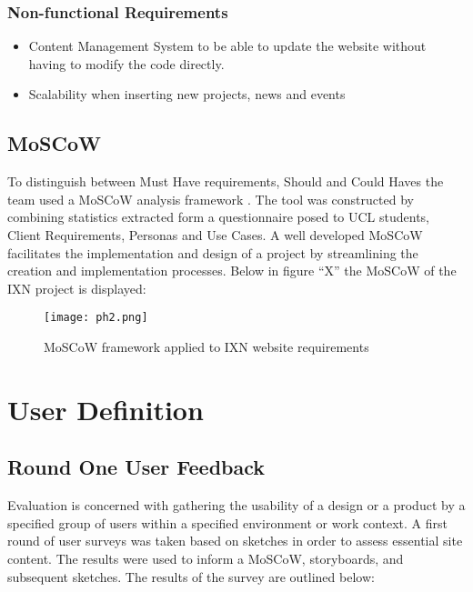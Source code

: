 \hypertarget{non-functional-requirements}{%
\subsubsection{Non-functional
Requirements}\label{non-functional-requirements}}

\begin{itemize}
\tightlist
\item
  Content Management System to be able to update the website without
  having to modify the code directly.
\item
  Scalability when inserting new projects, news and events
\end{itemize}

\hypertarget{moscow}{%
\subsection{MoSCoW}\label{moscow}}

To distinguish between Must Have requirements, Should and Could Haves
the team used a MoSCoW analysis framework \cite{g4}. The tool was
constructed by combining statistics extracted form a questionnaire posed
to UCL students, Client Requirements, Personas and Use Cases. A well
developed MoSCoW facilitates the implementation and design of a project
by streamlining the creation and implementation processes. Below in
figure ``X'' the MoSCoW of the IXN project is displayed:

\newpage

\begin{landscape}
\begin{figure}[H]
      \centering
      \texttt{[image: ph2.png]}
      \caption{MoSCoW framework applied to IXN website requirements}
 \end{figure}
 \end{landscape}

\hypertarget{user-definition}{%
\section{User Definition}\label{user-definition}}

\hypertarget{round-one-user-feedback}{%
\subsection{Round One User Feedback}\label{round-one-user-feedback}}

Evaluation is concerned with gathering the usability of a design or a
product by a specified group of users within a specified environment or
work context. A first round of user surveys was taken based on sketches
in order to assess essential site content. The results were used to
inform a MoSCoW, storyboards, and subsequent sketches. The results of
the survey are outlined below:

